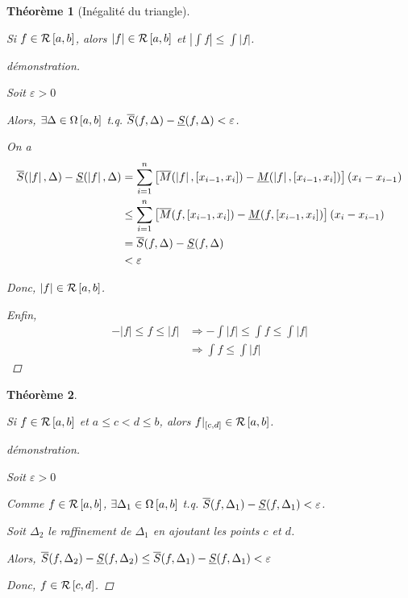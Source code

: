 \documentclass{report}
\newcommand*{\abs}[1]{\left| #1 \right|}
\newcommand*{\eps}{\varepsilon}
\newtheorem*{thm}{Th\'eor\`eme}
\theoremstyle{definition}
\theoremstyle{remark}
\begin{document}
	\begin{thm}[In\'egalit\'e du triangle]
		~

		Si $f \in \riemann$, alors $\abs{f} \in \riemann$ et $\abs{\int f} \leq \int\abs{f}$.
		\begin{proof}[d\'emonstration]~

			Soit $\eps>0$

			Alors, $\exists\Delta \in \partitions$ t.q. $\ssup{f}-\sinf{f}<\eps$.

			On a
			\begin{align*}
				\ssup{\abs{f}}-\sinf{\abs{f}}&= \sum_{i=1}^{n}\left[ \msup{\abs{f}}[\left[ x_{i-1},x_i \right]] - \minf{\abs{f}}[\left[ x_{i-1},x_i \right]] \right] \left( x_i-x_{i-1} \right)\\
				&\leq \sum_{i=1}^{n}\left[ \msup{f}[\left[ x_{i-1},x_i \right]] - \minf{f}[\left[ x_{i-1},x_i \right]] \right] \left( x_i-x_{i-1} \right)\\
				&= \ssup{f}-\sinf{f}\\
				&< \eps
			\end{align*}

			Donc, $\abs{f} \in \riemann$.

			Enfin,
			\begin{align*}
				-\abs{f} \leq f \leq \abs{f}&\Rightarrow -\int\abs{f} \leq \int f \leq \int\abs{f}\\
				&\Rightarrow \int f \leq \int\abs{f}
			\end{align*}
		\end{proof}
	\end{thm}
	\begin{thm}
		~

		Si $f \in \riemann$ et $a \leq c < d \leq b$, alors $f|_{[c,d]} \in \riemann$.
		\begin{proof}[d\'emonstration]~

			Soit $\eps>0$

			Comme $f \in \riemann$, $\exists\Delta_1 \in \partitions$ t.q. $\ssup{f}[\Delta_1]-\sinf{f}[\Delta_1] < \eps$.

			Soit $\Delta_2$ le raffinement de $\Delta_1$ en ajoutant les points $c$ et $d$.

			Alors, $\ssup{f}[\Delta_2]-\sinf{f}[\Delta_2] \leq \ssup{f}[\Delta_1]-\sinf{f}[\Delta_1] < \eps$

			Donc, $f \in \riemann[c,d]$.
		\end{proof}
	\end{thm}
\end{document}
